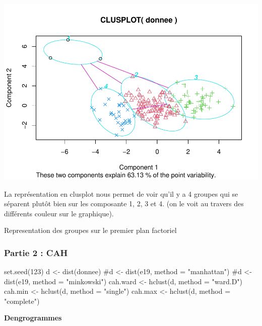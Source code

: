 \documentclass[
]{article}
\newenvironment{Shaded}{}{}
\newcommand{\AttributeTok}[1]{#1}
\newcommand{\CommentTok}[1]{\textcolor[rgb]{0.00,0.50,0.00}{#1}}
\newcommand{\DecValTok}[1]{#1}
\newcommand{\FunctionTok}[1]{#1}
\newcommand{\NormalTok}[1]{#1}
\newcommand{\OtherTok}[1]{\textcolor[rgb]{1.00,0.25,0.00}{#1}}
\newcommand{\StringTok}[1]{\textcolor[rgb]{0.00,0.50,0.50}{#1}}
\begin{document}
\includegraphics{projet_classification_files/figure-latex/unnamed-chunk-10-1.pdf}

La représentation en clusplot nous permet de voir qu'il y a 4 groupes
qui se séparent plutôt bien sur les composante 1, 2, 3 et 4. (on le voit
au travers des différents couleur sur le graphique).

Representation des groupes sur le premier plan factoriel

\hypertarget{partie-2-cah}{%
\subsubsection{Partie 2 : CAH}\label{partie-2-cah}}

\begin{Shaded}
\begin{Highlighting}[]
\FunctionTok{set.seed}\NormalTok{(}\DecValTok{123}\NormalTok{)}
\NormalTok{d }\OtherTok{\textless{}{-}} \FunctionTok{dist}\NormalTok{(donnee)}
\CommentTok{\#d \textless{}{-} dist(e19, method = "manhattan")}
\CommentTok{\#d \textless{}{-} dist(e19, method = "minkowski")}
\NormalTok{cah.ward }\OtherTok{\textless{}{-}} \FunctionTok{hclust}\NormalTok{(d, }\AttributeTok{method =} \StringTok{"ward.D"}\NormalTok{)}
\NormalTok{cah.min }\OtherTok{\textless{}{-}} \FunctionTok{hclust}\NormalTok{(d, }\AttributeTok{method =} \StringTok{"single"}\NormalTok{)}
\NormalTok{cah.max }\OtherTok{\textless{}{-}} \FunctionTok{hclust}\NormalTok{(d, }\AttributeTok{method =} \StringTok{"complete"}\NormalTok{)}
\end{Highlighting}
\end{Shaded}

\textbf{Dengrogrammes}
\end{document}
